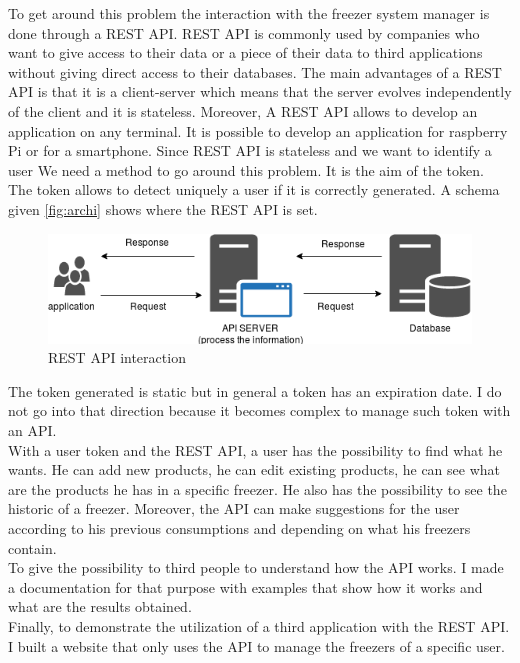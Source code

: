To get around this problem  the interaction with the freezer system manager is done through a REST API. REST API is commonly used by companies who want to give access to their data or a piece of their data to third applications without giving direct access to their databases. The main advantages of a REST API is that it is a client-server which means that the server evolves independently of the client and it is stateless. Moreover, A REST API allows to develop an application on any terminal. It is possible to develop an application for raspberry Pi or for a smartphone. Since REST API is stateless and we want to identify a user We need a method to go around this problem. It is the aim of the token. The token allows to detect uniquely a user if it is correctly generated. A schema given \autoref{fig:archi} shows where the REST API is set. \\
\begin{figure}[H]
\centering
\includegraphics[scale=0.5]{./images/archi.png}
\caption{REST API interaction}
\label{fig:archi}
\end{figure}

The token generated is static but in general a token has an expiration date. I do not go into that direction because it becomes complex to manage such token with an API.\\

With a user token and the REST API, a user has the possibility to find what he wants. He can add new products, he can edit existing products, he can see what are the products he has in a specific freezer. He also has the possibility to see the historic of a freezer. Moreover, the API can make suggestions for the user according to his previous consumptions and depending on what his freezers contain.\\

To give the possibility to third people to understand how the API works. I made a documentation for that purpose with examples that show how it works and what are the results obtained. \\

Finally, to demonstrate the utilization of a third application with the REST API. I built a website that only uses the API to manage the freezers of a specific user.\\


